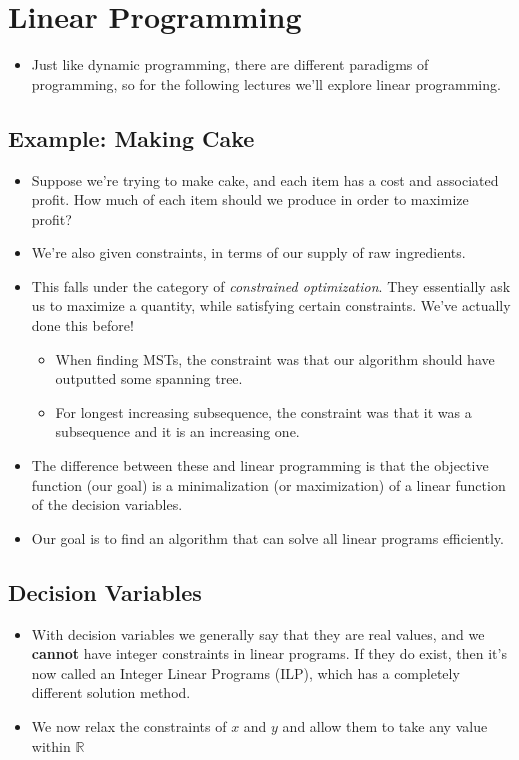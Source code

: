 \section{Linear Programming}
\begin{itemize}
	\item Just like dynamic programming, there are different paradigms of programming, so for the following 
		lectures we'll explore linear programming.
\end{itemize}
\subsection{Example: Making Cake}
\begin{itemize}
	\item Suppose we're trying to make cake, and each item has a cost and associated profit. How much of 
		each item should we produce in order to maximize profit? 
	\item We're also given constraints, in terms of our supply of raw ingredients. 
	\item This falls under the category of \textit{constrained optimization}. They essentially ask us 
		to maximize a quantity, while satisfying certain constraints. We've actually done this before!
		\begin{itemize}
			\item When finding MSTs, the constraint was that our algorithm should have outputted some spanning
				tree. 
			\item For longest increasing subsequence, the constraint was that it was a subsequence and it is 
				an increasing one. 
		\end{itemize}
	\item The difference between these and linear programming is that the objective function (our goal)
		is a minimalization (or maximization) of a linear function of the decision variables. 
	\item Our goal is to find an algorithm that can solve all linear programs efficiently. 
\end{itemize}
\subsection{Decision Variables}
\begin{itemize}
	\item With decision variables we generally say that they are real values, and we \textbf{cannot} have 
		integer constraints in linear programs. If they do exist, then it's now called an Integer Linear 
		Programs (ILP), which has a completely different solution method.
	\item We now relax the constraints of \( x \) and \( y \) and allow them to take any value within 
		\( \mathbb R \)
\end{itemize}
